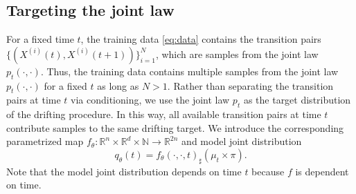 \documentclass[10pt,a4paper]{amsart}
\newcommand{\R}{\mathbb{R}}
\begin{document}
\subsection{Targeting the joint law}
For a fixed time $t$, the training data \eqref{eq:data} contains the transition pairs  $\{(X^{(i)}(t),X^{(i)}(t+1))\}_{i=1}^{N}$, which are samples from the joint law $p_t(\cdot,\cdot)$.
Thus, the training data contains multiple samples from the joint law $p_t(\cdot,\cdot)$ for a fixed $t$ as long as $N > 1$.
Rather than separating the transition pairs at time $t$ via conditioning, we use the joint law $p_t$ as the target distribution of the drifting procedure. In this way, all available
    transition pairs at time $t$ contribute samples to the same drifting target.
We introduce the corresponding parametrized map $
        f_\theta:
        \R^n\times\R^d\times\mathbb{N}
        \to
        \R^{2n}
    $
    and model joint distribution
\begin{equation}\label{eq:TargetJointatTheta}
        q_\theta(t)
        =
        f_\theta(\cdot,\cdot,t)_{\sharp}
        (\mu_t\times\pi).
    \end{equation}
    Note that the model joint distribution depends on time $t$ because $f$ is dependent on time. 

    
\end{document}

